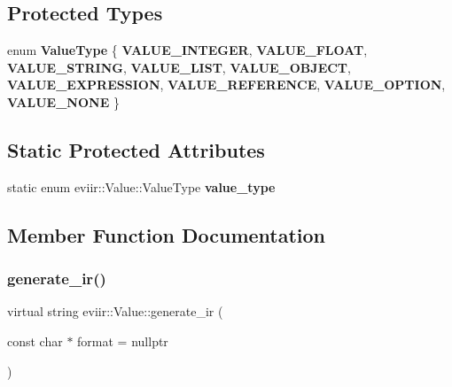 \subsection*{Protected Types}
\begin{DoxyCompactItemize}
\item 
\mbox{\label{classeviir_1_1Value_a5dd9affe8c2a568969eeabea66f12492}} 
enum {\bfseries Value\+Type} \{ \newline
{\bfseries V\+A\+L\+U\+E\+\_\+\+I\+N\+T\+E\+G\+ER}, 
\newline
{\bfseries V\+A\+L\+U\+E\+\_\+\+F\+L\+O\+AT}, 
\newline
{\bfseries V\+A\+L\+U\+E\+\_\+\+S\+T\+R\+I\+NG}, 
\newline
{\bfseries V\+A\+L\+U\+E\+\_\+\+L\+I\+ST}, 
\newline
{\bfseries V\+A\+L\+U\+E\+\_\+\+O\+B\+J\+E\+CT}, 
\newline
{\bfseries V\+A\+L\+U\+E\+\_\+\+E\+X\+P\+R\+E\+S\+S\+I\+ON}, 
\newline
{\bfseries V\+A\+L\+U\+E\+\_\+\+R\+E\+F\+E\+R\+E\+N\+CE}, 
\newline
{\bfseries V\+A\+L\+U\+E\+\_\+\+O\+P\+T\+I\+ON}, 
\newline
{\bfseries V\+A\+L\+U\+E\+\_\+\+N\+O\+NE}
 \}
\end{DoxyCompactItemize}
\subsection*{Static Protected Attributes}
\begin{DoxyCompactItemize}
\item 
\mbox{\label{classeviir_1_1Value_abe5d48ea672eba21c188c91c46cf048c}} 
static enum eviir\+::\+Value\+::\+Value\+Type {\bfseries value\+\_\+type}
\end{DoxyCompactItemize}


\subsection{Member Function Documentation}
\mbox{\label{classeviir_1_1Value_a0613bf660425df31e230681555f64dea}} 
\subsubsection{\texorpdfstring{generate\+\_\+ir()}{generate\_ir()}}
{\footnotesize\ttfamily virtual string eviir\+::\+Value\+::generate\+\_\+ir (\begin{DoxyParamCaption}\item[{const char $\ast$}]{format = {\ttfamily nullptr} }\end{DoxyParamCaption})\hspace{0.3cm}{\ttfamily [pure virtual]}}

